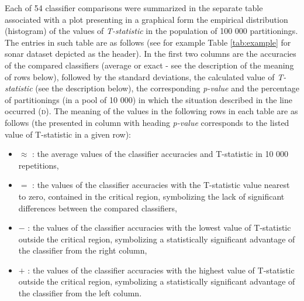 \documentclass[final,3p,times,onecolumn]{elsarticle}
\begin{document}



Each of 54 classifier comparisons were summarized in the separate table associated with a plot presenting in a graphical form the empirical distribution (histogram) of the values of \emph{T-statistic} in the population of 100 000 partitionings. The entries in such table are as follows (see for example Table \ref{tab:example} for sonar dataset depicted as the header). In the first two columns are the accuracies of the compared classifiers (average or exact - see the description of the meaning of rows below), followed by the standard deviations, the calculated value of \emph{T-statistic} (see the description below), the corresponding \emph{p-value} and the percentage of partitionings (in a pool of 10 000) in which the situation described in the line occurred (\textsc{d}). The meaning of the values in the following rows in each table are as follows (the presented in column with heading \emph{p-value} corresponds to the listed value of T-statistic in a given row):

\begin{itemize}
	\item $\approx$ : the average values of the classifier accuracies and T-statistic in 10 000 repetitions,
	\item $=$ : the values of the classifier accuracies with the T-statistic value nearest to zero, contained in the critical region, symbolizing the lack of significant differences between the compared classifiers,
	\item $-$ : the values of the classifier accuracies with the lowest value of T-statistic outside the critical region, symbolizing a statistically significant advantage of the classifier from the right column,
	\item $+$ : the values of the classifier accuracies with the highest value of T-statistic outside the critical region, symbolizing a statistically significant advantage of the classifier from the left column.
\end{itemize}
\end{document}
